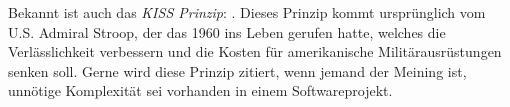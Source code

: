 \documentclass[a4paper,11pt]{article}
\begin{document}
Bekannt ist auch das \textit{KISS Prinzip}: . Dieses Prinzip kommt ursprünglich vom U.S. Admiral Stroop, der das  1960 ins Leben gerufen hatte, welches die Verlässlichkeit verbessern und die Kosten für amerikanische Militärausrüstungen senken soll. \cite{dalzell2009} Gerne wird diese Prinzip zitiert, wenn jemand der Meining ist, unnötige Komplexität sei vorhanden in einem Softwareprojekt.

\end{document}
